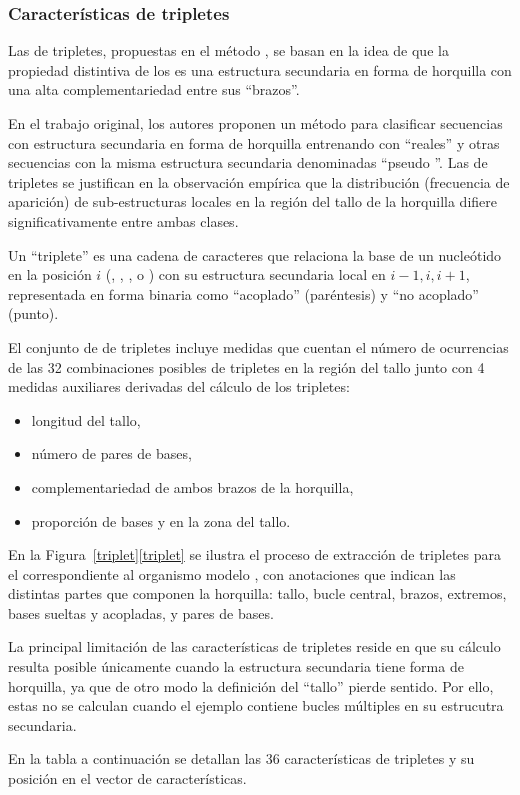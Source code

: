 %
%
\subsubsection{Características de tripletes}
%
Las  de tripletes, propuestas en el método 
\cite{xue}, se basan en la idea de que la propiedad distintiva de los
 es una estructura secundaria en forma de horquilla con
una alta complementariedad entre sus ``brazos''.

En el trabajo original, los autores proponen un método para clasificar
secuencias con estructura secundaria en forma de horquilla entrenando
con  ``reales'' y otras secuencias con la misma estructura
secundaria denominadas ``pseudo ''.
Las  de tripletes se justifican en la observación empírica
que la distribución (frecuencia de aparición) de sub-estructuras
locales en la región del tallo de la horquilla difiere
significativamente entre ambas clases.


Un ``triplete'' es una cadena de caracteres que relaciona la base de
un nucleótido en la posición $i$ (\ntA, \ntC, \ntG, o \ntU) con su
estructura secundaria local en $i-1,i,i+1$, representada en forma
binaria como ``acoplado'' \pairL (paréntesis) y ``no acoplado''
\noPair (punto).

El conjunto de  de tripletes incluye medidas que cuentan
el número de ocurrencias de las 32 combinaciones posibles de tripletes
en la región del tallo junto con 4 medidas auxiliares derivadas
del cálculo de los tripletes:
%
\begin{itemize}
\item longitud del tallo,
\item número de pares de bases,
\item complementariedad de ambos brazos de la horquilla,
\item proporción de bases \ntG y \ntC en la zona del tallo.
\end{itemize}
%

En la \iflatexml{}Figura~\ref{triplet}\else\autoref{triplet}\fi{} se
ilustra el proceso de extracción de tripletes para el \premirna{}
 correspondiente al organismo modelo 
\cite{mirbase1}, con anotaciones que indican las distintas partes que
componen la horquilla: tallo, bucle central, brazos, extremos, bases
sueltas y acopladas, y pares de bases.

La principal limitación de las características de tripletes reside en
que su cálculo resulta posible únicamente cuando la estructura
secundaria tiene forma de horquilla, ya que de otro modo la definición
del ``tallo'' pierde sentido. Por ello, estas  no se
calculan cuando el ejemplo contiene bucles múltiples en su estrucutra
secundaria.

En la tabla a continuación se detallan las 36 características de
tripletes y su posición en el vector de características.

